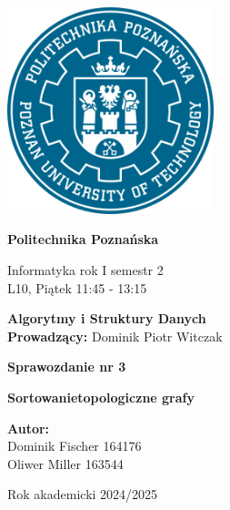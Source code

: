 \documentclass{article}
\begin{document}
	
	
	\thispagestyle{empty} %
	
	\begin{center}
		\includegraphics[width=6cm]{Image/PP-PUT-LOGO.png}
		\vspace{1cm}
		
		{\Huge\bfseries Politechnika Poznańska}
		
		\vspace{1cm}
		
		{\large Informatyka rok I semestr 2} \\[0.3cm]
		L10, Piątek 11:45 - 13:15
		
		\vspace{1.5cm}
		
		{\LARGE\bfseries Algorytmy i Struktury Danych} \\[0.3cm]
		\textbf{Prowadzący:} Dominik Piotr Witczak
		
		\vspace{2cm}
		
		{\LARGE\bfseries Sprawozdanie nr 3} 
		
		\vspace{1cm}
		
		{\Large\bfseries Sortowanietopologiczne grafy}
		
		\vspace{3cm}
		
		\begin{flushright}
			\textbf{Autor:} \\[0.2cm]
			Dominik Fischer 164176 \\
			Oliwer Miller 163544
		\end{flushright}
		
		\vspace{1.5cm}
		Rok akademicki 2024/2025
	\end{center}
	
\end{document}
